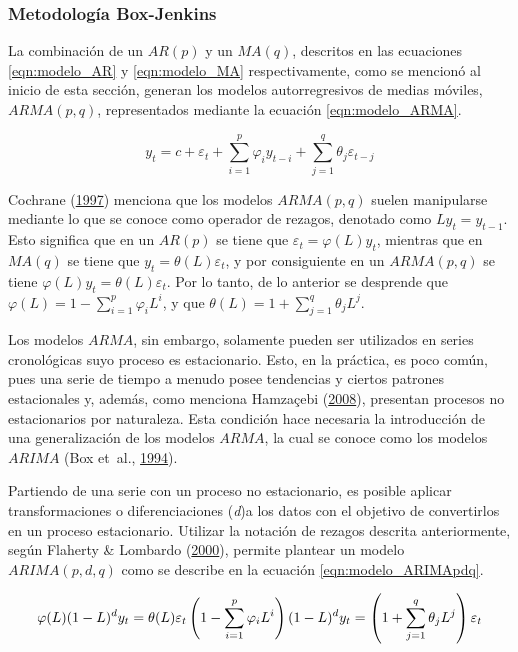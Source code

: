 \documentclass[
]{article}
\begin{document}
\subsubsection{Metodología Box-Jenkins}

La combinación de un \(AR(p)\) y un \(MA(q)\), descritos en las
ecuaciones \ref{eqn:modelo_AR} y \ref{eqn:modelo_MA} respectivamente,
como se mencionó al inicio de esta sección, generan los modelos
autorregresivos de medias móviles, \(ARMA(p,q)\), representados mediante
la ecuación \ref{eqn:modelo_ARMA}.

\begin{equation}
\label{eqn:modelo_ARMA}
y_t=c+\varepsilon_t+\sum_{i=1}^p \varphi_iy_{t-i}+\sum_{j=1}^q \theta_j \varepsilon_{t-j}
\end{equation}

Cochrane (\protect\hyperlink{ref-Cochrane}{1997}) menciona que los
modelos \(ARMA(p,q)\) suelen manipularse mediante lo que se conoce como
operador de rezagos, denotado como \(Ly_t=y_{t-1}\). Esto significa que
en un \(AR(p)\) se tiene que \(\varepsilon_t=\varphi(L)y_t\), mientras
que en \(MA(q)\) se tiene que \(y_t=\theta(L)\varepsilon_t\), y por
consiguiente en un \(ARMA(p,q)\) se tiene
\(\varphi(L)y_t=\theta(L)\varepsilon_t\). Por lo tanto, de lo anterior
se desprende que \(\varphi(L)=1-\sum_{i=1}^p \varphi_iL^i\), y que
\(\theta(L)=1+\sum_{j=1}^q\theta_jL^j\).

Los modelos \(ARMA\), sin embargo, solamente pueden ser utilizados en
series cronológicas suyo proceso es estacionario. Esto, en la práctica,
es poco común, pues una serie de tiempo a menudo posee tendencias y
ciertos patrones estacionales y, además, como menciona Hamzaçebi
(\protect\hyperlink{ref-Hamzacebi}{2008}), presentan procesos no
estacionarios por naturaleza. Esta condición hace necesaria la
introducción de una generalización de los modelos \(ARMA\), la cual se
conoce como los modelos \(ARIMA\) (Box et~al.,
\protect\hyperlink{ref-box-jenkins}{1994}).

Partiendo de una serie con un proceso no estacionario, es posible
aplicar transformaciones o diferenciaciones (\emph{d})a los datos con el
objetivo de convertirlos en un proceso estacionario. Utilizar la
notación de rezagos descrita anteriormente, según Flaherty \& Lombardo
(\protect\hyperlink{ref-Lombardo}{2000}), permite plantear un modelo
\(ARIMA(p,d,q)\) como se describe en la ecuación
\ref{eqn:modelo_ARIMApdq}.

\begin{equation}
\label{eqn:modelo_ARIMApdq}
\varphi(L)(1-L)^dy_t=\theta(L)\varepsilon_t\\
\left(1-\sum_{i=1}^p \varphi_iL^i \right)(1-L)^d y_t=\left(1+\sum_{j=1}^q \theta_jL^j \right) \varepsilon_t
\end{equation}
\end{document}
